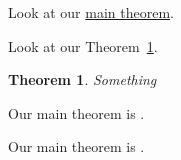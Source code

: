 \documentclass{amsart}
\newtheorem{theorem}{Theorem}
\begin{document}
Look at our \hyperref[thm]{main theorem}.

Look at our Theorem~\ref{thm}.

\begin{theorem}\label{thm}
  Something
\end{theorem}

Our main theorem is .

Our main theorem is .
\end{document}
